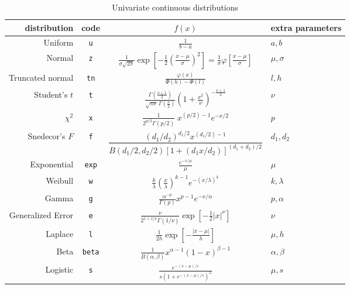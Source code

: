 \begin{table}[htbp]
\centering
\begin{tabular}{rccl}
  \hline
  distribution	& code	& $f(x)$	& extra parameters \\
  \hline
  Uniform	& \texttt{u}
      & $\frac{1}{b-a}$	&  $a,b$\\[9pt]
  Normal	& \texttt{z}
      & $\frac{1}{\sigma \sqrt{2\pi}}
      \exp\left[-\frac{1}{2}\left(\frac{x-\mu}{\sigma}\right)^2\right]
        = \frac{1}{\sigma} \varphi\left[ \frac{x-\mu}{\sigma} \right]$
      & $\mu, \sigma$ \\[9pt]
  Truncated normal & \texttt{tn}
      & $\frac{\varphi(x)}{\Phi(h) - \Phi(l)}$
      & $l, h$ \\[9pt]
  Student's $t$	& \texttt{t}
      & $\frac{\Gamma{\left(\frac{\nu + 1}{2}\right)}}{\sqrt{\pi\nu}\,
        \Gamma{\left(\frac{\nu}{2}\right)}}
        \left(1 + \frac{x^2}{\nu}\right)^{-\frac{\nu+1}{2}}$
      & $\nu$ \\[9pt]
  $\chi^2$	& \texttt{x}
      & $\frac{1}{2^{p/2}\Gamma(p/2)}\; x^{(p/2)-1} e^{-x/2}$
      &  $p$ \\[9pt]
  Snedecor's $F$	& \texttt{f}
      & $\dfrac{(d_1/d_2)^{d_1/2} x^{(d_1/2)-1}}
       {B(d_1/2, d_2/2)[1+(d_1x/d_2)]^{(d_1+d_2)/2}}$
      & $d_1, d_2$ \\[9pt]
  Exponential	& \texttt{exp}
      & $\frac{e^{-x/\mu}}{\mu}$	& $\mu$ \\[9pt]
  Weibull	& \texttt{w}
      & $\frac{k}{\lambda}\left(\frac{x}{\lambda}\right)^{k-1}
        e^{-(x/\lambda)^{k}}$
      & $k, \lambda$ \\[9pt]
  Gamma	& \texttt{g}
      & $\frac{ \alpha^{-p}}{\Gamma(p)} x^{p - 1} e^{-x/\alpha}$

      & $p, \alpha$ \\[9pt]
  Generalized Error	& \texttt{e}
      & $\frac{\nu}{2^{1+1/\nu} \Gamma(1/\nu)} \exp[{-\frac{1}{2}|x|^\nu}]$
      & $\nu$  \\[9pt]
  Laplace	& \texttt{l}
     & $\frac{1}{2 h} \exp[{-\frac{|x - \mu|}{h}}]$
     & $\mu, h$ \\[9pt]
  Beta	& \texttt{beta}
     & $\frac{1}{B(\alpha,\beta)} x^{\alpha-1}(1-x)^{\beta-1}$
     & $\alpha, \beta$	\\[9pt]
  Logistic	& \texttt{s}
     & $\frac{e^{-(x-\mu)/s}} {s\left(1+e^{-(x-\mu)/s}\right)^2}$

     & $\mu, s$ \\
  \hline
  \end{tabular}
  \medskip\par
  \caption{Univariate continuous distributions}
\label{tab:continuous}
\end{table}

